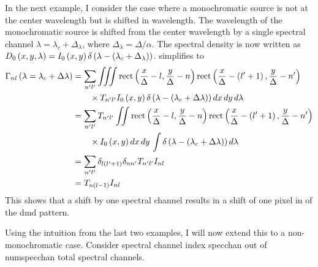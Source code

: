 In the next example, I consider the case where a monochromatic source is not at the center wavelength but is shifted in wavelength. The wavelength of the monochromatic source is shifted from the center wavelength by a single spectral channel $\lambda= \lambda_c + \Delta_{\lambda}$, where $ \Delta_{\lambda} = \Delta / \alpha$. The spectral density is now written as $D_0 \left(x, y, \lambda\right) = I_0 \left(x, y \right) \delta \left( \lambda - \ap{\lambda_c + \Delta_{\lambda} } \right)$.  simplifies to
%
\begin{align} 
	\Gamma_{nl}\left(\lambda = \lambda_c + \Delta \lambda\right) &= \sum_{n'l'} \iiint \mbox{rect} \left( \frac{x}{\Delta} - l, \frac{y}{\Delta} - n \right)  \mbox{rect} \left( \frac{x}{\Delta} - \left(l' + 1 \right), \frac{y}{\Delta} - n' \right) \notag \\
 	&\qquad \times T_{n'l'} I_0 \left( x, y \right) \delta \left( \lambda - \left( \lambda_c + \Delta \lambda \right)\right) dx \, dy \, d\lambda  \notag \\
	&= \sum_{ n^\prime l^\prime} T_{n^\prime l^\prime}  \iint \mbox{rect} \left( \frac{x}{\Delta} -  l, \frac{y}{\Delta} - n \right)  \mbox{rect} \left( \frac{x}{\Delta} - \left(l' + 1 \right), \frac{y}{\Delta} - n' \right) \notag \\
	&\qquad \times I_0 \left( x, y \right) dx \, dy \, \int \delta \left( \lambda - \left( \lambda_c + \Delta \lambda \right)\right) d\lambda  \notag \\
 	&= \sum_{n'l'} \delta_{l \left( l' + 1 \right) } \delta_{nn'} T_{n' l'} I_{nl} \notag \\
 	&= T_{n\left(l - 1 \right)} I_{nl}
 	\label{eq:Mono2}
 \end{align}
%
This shows that a shift by one spectral channel results in a shift of one pixel in of the \gls{dmd} pattern.

Using the intuition from the last two examples, I will now extend this to a non-monochromatic case. Consider spectral channel index \gls{specchan} out of \gls{numspecchan} total spectral channels.

